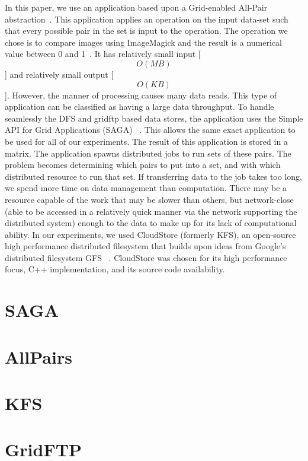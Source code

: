 \documentclass{rspublic}
\begin{document}
In this paper, we use an application based upon a Grid-enabled All-Pair
abstraction~\citep{Interop, AllPairs}. This application applies an
operation on the input data-set such that every possible pair in the set
is input to the operation. The operation we chose is to compare images
using ImageMagick and the result is a numerical value between 0 and
1~\citep{imagemagick}. It has relatively small input
[\begin{equation}O(MB)\end{equation}] and relatively small output
[\begin{equation}O(KB)\end{equation}]. However, the manner of processing
causes many data reads. This type of application can be classified as
having a large data throughput. To handle seamlessly the DFS and gridftp
based data stores, the application uses the Simple API for Grid
Applications (SAGA) ~\citep{saga_web}. This allows the same exact
application to be used for all of our experiments. The result of this
application is stored in a matrix. The application spawns distributed
jobs to run sets of these pairs.  The problem becomes determining which
pairs to put into a set, and with which distributed resource to run that
set. If transferring data to the job takes too long, we spend more time
on data management than computation. There may be a resource capable of
the work that may be slower than others, but network-close (able to be
accessed in a relatively quick manner via the network supporting the
distributed system) enough to the data to make up for its lack of
computational ability. In our experiments, we used CloudStore (formerly
KFS), an open-source high performance distributed filesystem that builds
upon ideas from Google's distributed filesystem GFS ~\citep{kfs_web}.
CloudStore was chosen for its high performance focus, C++
implementation, and its source code availability.

\section{SAGA}
\section{AllPairs}
\section{KFS}
\section{GridFTP}
\end{document}
